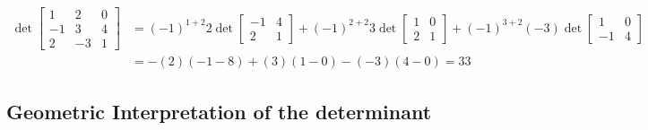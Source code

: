 \documentclass[10pt]{article}
\begin{document}
$\begin{array}{rl} 
\det\begin{bmatrix}
1&2&0\\
-1&3&4\\
2&-3&1
\end{bmatrix} 
&=
(-1)^{1+2}2
\det\begin{bmatrix}
-1&4\\
2&1
\end{bmatrix}
+(-1)^{2+2}3
\det\begin{bmatrix}
1&0\\
2&1
\end{bmatrix}
+(-1)^{3+2}(-3)
\det\begin{bmatrix}
1&0\\
-1&4
\end{bmatrix} \\
&=-(2)(-1-8) + (3)(1-0)-(-3)(4-0)=33\end{array}$

\subsection{Geometric Interpretation of the determinant}
\end{document}
